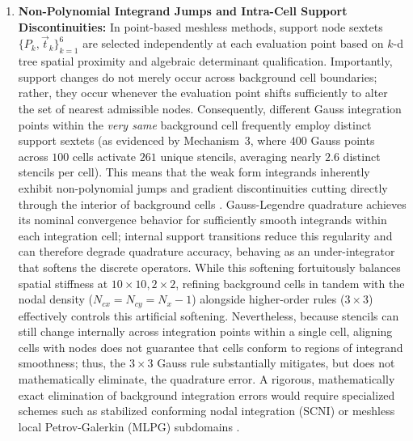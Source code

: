 \documentclass[preprint,12pt]{elsarticle}
\begin{document}
\begin{enumerate}
    \item \textbf{Non-Polynomial Integrand Jumps and Intra-Cell Support Discontinuities:} In point-based meshless methods, support node sextets $\{P_k, \vec{t}_k\}_{k=1}^6$ are selected independently at each evaluation point based on $k$-d tree spatial proximity and algebraic determinant qualification. Importantly, support changes do not merely occur across background cell boundaries; rather, they occur whenever the evaluation point shifts sufficiently to alter the set of nearest admissible nodes. Consequently, different Gauss integration points within the \emph{very same} background cell frequently employ distinct support sextets (as evidenced by Mechanism~3, where $400$ Gauss points across $100$ cells activate $261$ unique stencils, averaging nearly $2.6$ distinct stencils per cell). This means that the weak form integrands inherently exhibit non-polynomial jumps and gradient discontinuities cutting directly through the interior of background cells \cite{belytschko1994element, dolbow1999numerical}. Gauss-Legendre quadrature achieves its nominal convergence behavior for sufficiently smooth integrands within each integration cell; internal support transitions reduce this regularity and can therefore degrade quadrature accuracy, behaving as an under-integrator that softens the discrete operators. While this softening fortuitously balances spatial stiffness at $10 \times 10, 2 \times 2$, refining background cells in tandem with the nodal density ($N_{cx} = N_{cy} = N_x - 1$) alongside higher-order rules ($3 \times 3$) effectively controls this artificial softening. Nevertheless, because stencils can still change internally across integration points within a single cell, aligning cells with nodes does not guarantee that cells conform to regions of integrand smoothness; thus, the $3 \times 3$ Gauss rule substantially mitigates, but does not mathematically eliminate, the quadrature error. A rigorous, mathematically exact elimination of background integration errors would require specialized schemes such as stabilized conforming nodal integration (SCNI) \cite{chen2001stabilized} or meshless local Petrov-Galerkin (MLPG) subdomains \cite{atluri2002meshless}.
\end{enumerate}
\end{document}
